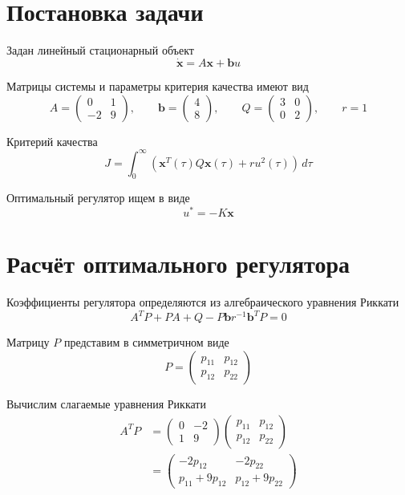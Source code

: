 
\section{Постановка задачи}

Задан линейный стационарный объект
\[
\dot{\bm x}=A\bm x+\bm b u
\]

Матрицы системы и параметры критерия качества имеют вид
\[
A=\begin{pmatrix}
0&1\\
-2&9
\end{pmatrix},
\qquad
\bm b=\begin{pmatrix}4\\8\end{pmatrix},
\qquad
Q=\begin{pmatrix}3&0\\0&2\end{pmatrix},
\qquad r=1
\]

Критерий качества
\[
J=\int_0^\infty
\left(\bm x^{T}(\tau)Q\bm x(\tau)
+ru^2(\tau)\right)\,d\tau
\]

Оптимальный регулятор ищем в виде
\[
u^*=-K\bm x
\]

\section{Расчёт оптимального регулятора}

Коэффициенты регулятора определяются из алгебраического
уравнения Риккати
\[
A^{T}P+PA+Q
-P\bm b r^{-1}\bm b^{T}P=0
\]

Матрицу $P$ представим в симметричном виде
\[
P=\begin{pmatrix}
p_{11}&p_{12}\\
p_{12}&p_{22}
\end{pmatrix}
\]

Вычислим слагаемые уравнения Риккати
\[
\begin{aligned}
A^{T}P
&=
\begin{pmatrix}0&-2\\1&9\end{pmatrix}
\begin{pmatrix}p_{11}&p_{12}\\p_{12}&p_{22}\end{pmatrix}
\\[2mm]
&=
\begin{pmatrix}
-2p_{12}&-2p_{22}\\
p_{11}+9p_{12}&p_{12}+9p_{22}
\end{pmatrix}
\end{aligned}
\]

